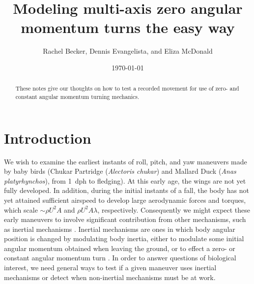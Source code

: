 \documentclass{amsart}
\title{Modeling multi-axis zero angular momentum turns the easy way}
\author{Rachel Becker, Dennis Evangelista, and Eliza McDonald}
\date{\today}
\begin{document}
\begin{abstract}
These notes give our thoughts on how to test a recorded movement for use of zero- and constant angular momentum turning mechanics. 
\end{abstract}
\maketitle
\tableofcontents

\section{Introduction}
We wish to examine the earliest instants of roll, pitch, and yaw maneuvers made by baby birds (Chukar Partridge (\emph{Alectoris chukar}) and Mallard Duck (\emph{Anas platyrhynchos}), from \SI{1}{dph} to fledging).  At this early age, the wings are not yet fully developed.  In addition, during the initial instants of a fall, the body has not yet attained sufficient airspeed to develop large aerodynamic forces and torques, which scale $\sim \rho U^2 A$ and $\rho U^2 A \lambda$, respectively.  Consequently we might expect these early maneuvers to involve significant contribution from other mechanisms, such as inertial mechanisms \cite{Edwards:1986, Jusufi:2008, Jusufi:2010}.  Inertial mechanisms are ones in which body angular position is changed by modulating body inertia, either to modulate some initial angular momentum obtained when leaving the ground, or to effect a zero- or constant angular momentum turn \cite{Edwards:1986}.  In order to answer questions of biological interest, we need general ways to test if a given maneuver uses inertial mechanisms or detect when non-inertial mechanisms must be at work. 
\end{document}
